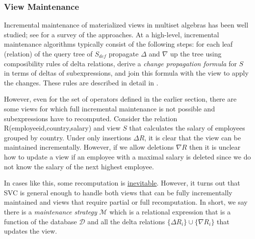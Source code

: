 \subsubsection{View Maintenance}

Incremental maintenance of materialized views in multiset algebras has been well studied; see \cite{chirkova2011materialized} for a survey of the approaches. 
At a high-level, incremental maintenance algorithms typically consist of the following steps: for each leaf (relation) of the query tree of $S_{def}$ propagate $\Delta$ and $\nabla$ up the tree using composibility rules of delta relations, derive a \emph{change propagation formula} for $S$ in terms of deltas of subexpressions, and join this formula with the view to apply the changes. 
These rules are described in detail in \cite{DBLP:journals/vldb/KochAKNNLS14, DBLP:conf/pods/Koch10}.

However, even for the set of operators defined in the earlier section, there are some views for which full incremental maintenance is not possible and subexpressions have to recomputed. Consider the relation R(employeeid,country,salary) and view $S$ that calculates the \maxfunc salary of employees grouped by country. Under only insertions $\Delta R$, it is clear that the view can be maintained incrementally. 
However, if we allow deletions $\nabla R$ then it is unclear how to update a view if an employee with a maximal salary is deleted since we do not know the salary of the next highest employee. 

In cases like this, some recomputation is \underline{inevitable}. 
However, it turns out that SVC is general enough to handle both views that can be fully incrementally maintained and views that require partial or full recomputation.
In short, we say there is a \emph{maintenance strategy} $\mathcal{M}$ which is a relational expression that is a function of the database $\mathcal{D}$ and all the delta relations $\{\Delta R_i\} \cup \{\nabla R_i\}$ that updates the view.

